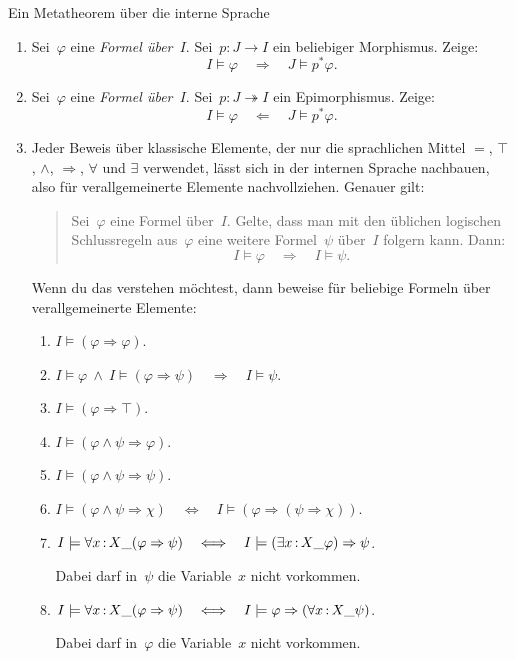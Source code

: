 \documentclass{uebblatt}
\begin{document}
\begin{aufgabe}{Ein Metatheorem über die interne Sprache}
\begin{enumerate}
\item Sei~$\varphi$ eine \emph{Formel über~$I$}. Sei~$p : J \to I$ ein beliebiger
Morphismus. Zeige:
\[ I \models \varphi \quad\Longrightarrow\quad
  J \models p^*\varphi. \]
\item Sei~$\varphi$ eine \emph{Formel über~$I$}. Sei~$p : J \twoheadrightarrow
I$ ein Epimorphismus. Zeige:
\[ I \models \varphi \quad\Longleftarrow\quad
  J \models p^*\varphi. \]
\item
Jeder Beweis über klassische Elemente, der nur die sprachlichen Mittel $=$,
$\top$, $\wedge$, $\Rightarrow$, $\forall$ und $\exists$ verwendet, lässt sich
in der internen Sprache nachbauen, also für verallgemeinerte Elemente
nachvollziehen. Genauer gilt:
\begin{quote}
Sei~$\varphi$ eine Formel über~$I$. Gelte, dass man mit den üblichen logischen
Schlussregeln aus~$\varphi$ eine weitere Formel~$\psi$ über~$I$ folgern
kann. Dann:
\[ I \models \varphi \quad\Longrightarrow\quad I \models \psi. \]
\end{quote}
Wenn du das verstehen möchtest, dann beweise für beliebige Formeln über
verallgemeinerte Elemente:
\begin{enumerate}
\item $I \models (\varphi \Rightarrow \varphi)$.
\item $I \models \varphi \ \wedge\  I \models (\varphi
\Rightarrow \psi) \quad\Longrightarrow\quad I \models \psi$.
\item $I \models (\varphi \Rightarrow \top)$.
\item $I \models (\varphi \wedge \psi \Rightarrow \varphi)$.
\item $I \models (\varphi \wedge \psi \Rightarrow \psi)$.
\item $I \models (\varphi \wedge \psi \Rightarrow \chi) \quad\Longleftrightarrow\quad
  I \models (\varphi \Rightarrow (\psi \Rightarrow \chi))$.
\item $I \models \forall x\,{:}\,X\_ (\varphi \Rightarrow \psi) \quad\Longleftrightarrow\quad
  I \models (\exists x\,{:}\,X\_ \varphi) \Rightarrow \psi$.

  Dabei darf in~$\psi$ die Variable~$x$ nicht vorkommen.
\item $I \models \forall x\,{:}\,X\_ (\varphi \Rightarrow \psi) \quad\Longleftrightarrow\quad
  I \models \varphi \Rightarrow (\forall x\,{:}\,X\_ \psi)$.

  Dabei darf in~$\varphi$ die Variable~$x$ nicht vorkommen.
\end{enumerate}
\end{enumerate}
\end{aufgabe}
\end{document}

